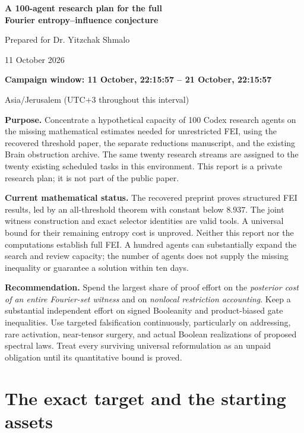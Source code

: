 \documentclass[11pt]{article}
\begin{document}
\begin{center}
{\Large\bfseries\color{ink} A 100-agent research plan for the full\\[3pt] Fourier entropy--influence conjecture}\par
\vspace{8pt}
{\large Prepared for Dr. Yitzchak Shmalo}\par
\vspace{4pt}
11 October 2026\par
\textbf{Campaign window: 11 October, 22:15:57 -- 21 October, 22:15:57}\par
Asia/Jerusalem (UTC+3 throughout this interval)
\end{center}
\vspace{6pt}
\textbf{Purpose.} Concentrate a hypothetical capacity of 100 Codex research agents on the missing mathematical estimates needed for unrestricted FEI, using the recovered threshold paper, the separate reductions manuscript, and the existing Brain obstruction archive. The same twenty research streams are assigned to the twenty existing scheduled tasks in this environment. This report is a private research plan; it is not part of the public paper.

\textbf{Current mathematical status.} The recovered preprint proves structured FEI results, led by an all-threshold theorem with constant below $8.937$. The joint witness construction and exact selector identities are valid tools. A universal bound for their remaining entropy cost is unproved. Neither this report nor the computations establish full FEI. A hundred agents can substantially expand the search and review capacity; the number of agents does not supply the missing inequality or guarantee a solution within ten days.

\textbf{Recommendation.} Spend the largest share of proof effort on the \emph{posterior cost of an entire Fourier-set witness} and on \emph{nonlocal restriction accounting}. Keep a substantial independent effort on signed Booleanity and product-biased gate inequalities. Use targeted falsification continuously, particularly on addressing, rare activation, near-tensor surgery, and actual Boolean realizations of proposed spectral laws. Treat every surviving universal reformulation as an unpaid obligation until its quantitative bound is proved.

\tableofcontents
\newpage
\section{The exact target and the starting assets}
\end{document}
